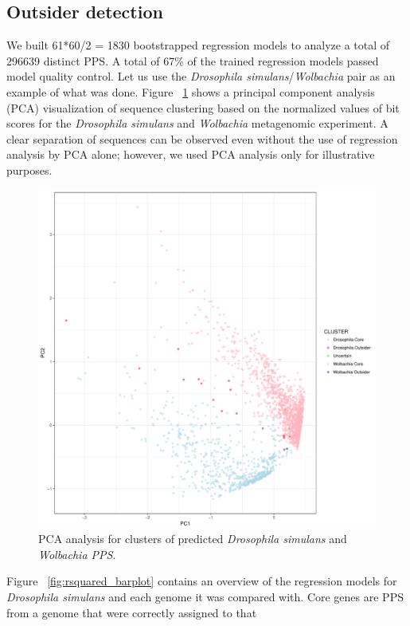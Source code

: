\subsection{Outsider detection}
\label{outsider_detection}
We built 61*60/2 = 1830 bootstrapped regression models to analyze a total of
296639 distinct PPS. A total of 67\% of the trained regression models passed
model quality control. Let us use the \textit{Drosophila
simulans}/\textit{Wolbachia} pair as an example of what was done. Figure
~\ref{fig:pca_analysis} shows a principal component analysis (PCA)
visualization of sequence clustering based on the normalized values of bit
scores for the \textit{Drosophila simulans} and \textit{Wolbachia} metagenomic
experiment. A clear separation of sequences can be observed even without the
use of regression analysis by PCA alone; however, we used PCA analysis only for
illustrative purposes.
\begin{center}
\begin{figure}
\includegraphics[width=12cm]{figures/w_eds_vs_ds_bootstrapped_pc1_pc2.pdf}
\caption{PCA analysis for clusters of predicted \textit{Drosophila simulans}
	and \textit{Wolbachia PPS}.}
\label{fig:pca_analysis}
\end{figure}
\end{center}
Figure ~\ref{fig:rsquared_barplot} contains an overview of the regression
models for \textit{Drosophila simulans} and each genome it was compared with.
Core genes are PPS from a genome that were correctly assigned to that
